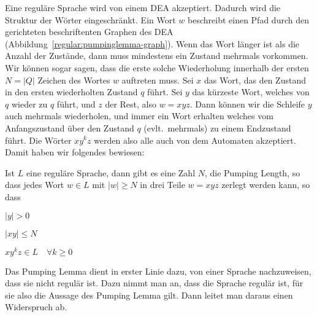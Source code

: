 Eine reguläre Sprache wird von einem DEA akzeptiert.
Dadurch wird die Struktur der Wörter eingeschränkt.
Ein Wort $w$ beschreibt
einen Pfad durch den gerichteten beschriftenten Graphen des DEA
(Abbildung~\ref{regular:pumpinglemma-graph}).
Wenn das Wort länger ist als die Anzahl der Zustände, dann muss
mindestens ein Zustand mehrmals vorkommen.
Wir können sogar
sagen, dass die erste solche Wiederholung innerhalb der ersten
$N = |Q|$ Zeichen des Wortes $w$ auftreten muss.
Sei $x$ das Wort,
das den Zustand in den ersten wiederholten Zustand $q$ führt.
Sei $y$ das kürzeste Wort, welches von $q$ wieder zu $q$ führt, und
$z$ der Rest, also $w=xyz$.
Dann können wir die Schleife $y$
auch mehrmals wiederholen, und immer ein Wort erhalten welches
vom Anfangszustand über den Zustand $q$ (evlt.~mehrmals) zu einem
Endzustand führt.
Die Wörter $xy^kz$ werden also alle auch von dem Automaten akzeptiert.
Damit haben wir folgendes bewiesen:
\begin{satz}
Ist $L$ eine reguläre Sprache, dann gibt es eine Zahl $N$, die Pumping Length, so dass
jedes Wort $w\in L$ mit $|w|\ge N$ in drei Teile
$w=xyz$ zerlegt werden kann, so dass
\begin{compactenum}
\item $|y| > 0$
\item $|xy|\le N$
\item $xy^kz\in L\quad\forall k\ge 0$
\end{compactenum}
\end{satz}

Das Pumping Lemma dient in erster Linie dazu, von einer Sprache
nachzuweisen, dass sie nicht regulär ist.
Dazu nimmt man an, dass die Sprache regulär ist, für sie also die Aussage
des Pumping Lemma gilt.
Dann leitet man daraus einen Widerspruch ab.


